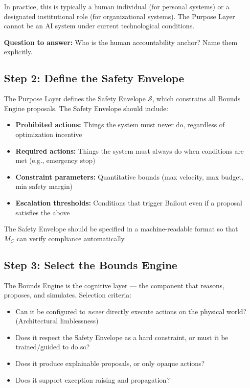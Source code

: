 \documentclass[12pt]{article}
\begin{document}
In practice, this is typically a human individual (for personal systems) or a designated institutional role (for organizational systems). The Purpose Layer cannot be an AI system under current technological conditions.

\textbf{Question to answer:} Who is the human accountability anchor? Name them explicitly.

\subsection{Step 2: Define the Safety Envelope}
The Purpose Layer defines the Safety Envelope $\mathcal{S}$, which constrains all Bounds Engine proposals. The Safety Envelope should include:

\begin{itemize}
\item \textbf{Prohibited actions:} Things the system must never do, regardless of optimization incentive
\item \textbf{Required actions:} Things the system must always do when conditions are met (e.g., emergency stop)
\item \textbf{Constraint parameters:} Quantitative bounds (max velocity, max budget, min safety margin)
\item \textbf{Escalation thresholds:} Conditions that trigger Bailout even if a proposal satisfies the above
\end{itemize}

The Safety Envelope should be specified in a machine-readable format so that $M_C$ can verify compliance automatically.

\subsection{Step 3: Select the Bounds Engine}
The Bounds Engine is the cognitive layer — the component that reasons, proposes, and simulates. Selection criteria:

\begin{itemize}
\item Can it be configured to \textit{never} directly execute actions on the physical world? (Architectural limblessness)
\item Does it respect the Safety Envelope as a hard constraint, or must it be trained/guided to do so?
\item Does it produce explainable proposals, or only opaque actions?
\item Does it support exception raising and propagation?
\end{itemize}
\end{document}
